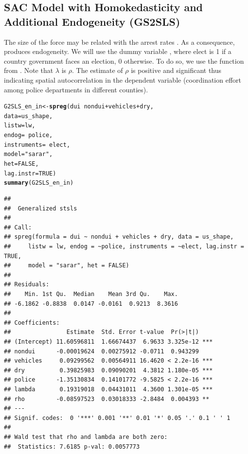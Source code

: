 \documentclass[english,12pt]{book}\usepackage[]{graphicx}\usepackage[]{xcolor}
\makeatletter
\newcommand{\hlnum}[1]{\textcolor[rgb]{0.686,0.059,0.569}{#1}}%
\newcommand{\hlstr}[1]{\textcolor[rgb]{0.192,0.494,0.8}{#1}}%
\newcommand{\hlopt}[1]{\textcolor[rgb]{0,0,0}{#1}}%
\newcommand{\hlstd}[1]{\textcolor[rgb]{0.345,0.345,0.345}{#1}}%
\newcommand{\hlkwb}[1]{\textcolor[rgb]{0.69,0.353,0.396}{#1}}%
\newcommand{\hlkwc}[1]{\textcolor[rgb]{0.333,0.667,0.333}{#1}}%
\newcommand{\hlkwd}[1]{\textcolor[rgb]{0.737,0.353,0.396}{\textbf{#1}}}%
\newenvironment{kframe}{%
 \def\at@end@of@kframe{}%
 \ifinner\ifhmode%
  \def\at@end@of@kframe{\end{minipage}}%
  \begin{minipage}{\columnwidth}%
 \fi\fi%
 \def\FrameCommand##1{\hskip\@totalleftmargin \hskip-\fboxsep
 \colorbox{shadecolor}{##1}\hskip-\fboxsep
     \hskip-\linewidth \hskip-\@totalleftmargin \hskip\columnwidth}%
 \MakeFramed {\advance\hsize-\width
   \@totalleftmargin\z@ \linewidth\hsize
   \@setminipage}}%
 {\par\unskip\endMakeFramed%
 \at@end@of@kframe}
\newenvironment{knitrout}{}{} %
\makeatother
\begin{document}
\subsection{SAC Model with Homokedasticity and Additional Endogeneity (GS2SLS)}

The size of the  force may be related with the arrest rates . As a consequence,  produces endogeneity. We will use the dummy variable , where elect is 1 if a country government faces an election, 0 otherwise. To do so, we use the  function from . Note that $\lambda$ is $\rho$. The estimate of $\rho$ is positive and significant thus indicating spatial autocorrelation in the dependent variable (coordination effort among police departments in different counties). 


\begin{knitrout}
\color{fgcolor}\begin{kframe}
\begin{alltt}
\hlstd{G2SLS_en_in} \hlkwb{<-} \hlkwd{spreg}\hlstd{(dui} \hlopt{~} \hlstd{nondui} \hlopt{+} \hlstd{vehicles} \hlopt{+} \hlstd{dry,}
                \hlkwc{data} \hlstd{= us_shape,}
                \hlkwc{listw} \hlstd{= lw,}
               \hlkwc{endog} \hlstd{=} \hlopt{~} \hlstd{police,}
               \hlkwc{instruments} \hlstd{=} \hlopt{~} \hlstd{elect,}
               \hlkwc{model} \hlstd{=} \hlstr{"sarar"}\hlstd{,}
               \hlkwc{het} \hlstd{=} \hlnum{FALSE}\hlstd{,}
               \hlkwc{lag.instr} \hlstd{=} \hlnum{TRUE}\hlstd{)}
\hlkwd{summary}\hlstd{(G2SLS_en_in)}
\end{alltt}
\begin{verbatim}
## 
##  Generalized stsls
## 
## Call:
## spreg(formula = dui ~ nondui + vehicles + dry, data = us_shape, 
##     listw = lw, endog = ~police, instruments = ~elect, lag.instr = TRUE, 
##     model = "sarar", het = FALSE)
## 
## Residuals:
##    Min. 1st Qu.  Median    Mean 3rd Qu.    Max. 
## -6.1862 -0.8838  0.0147 -0.0161  0.9213  8.3616 
## 
## Coefficients:
##                Estimate  Std. Error t-value  Pr(>|t|)    
## (Intercept) 11.60596811  1.66674437  6.9633 3.325e-12 ***
## nondui      -0.00019624  0.00275912 -0.0711  0.943299    
## vehicles     0.09299562  0.00564911 16.4620 < 2.2e-16 ***
## dry          0.39825983  0.09090201  4.3812 1.180e-05 ***
## police      -1.35130834  0.14101772 -9.5825 < 2.2e-16 ***
## lambda       0.19319018  0.04431011  4.3600 1.301e-05 ***
## rho         -0.08597523  0.03018333 -2.8484  0.004393 ** 
## ---
## Signif. codes:  0 '***' 0.001 '**' 0.01 '*' 0.05 '.' 0.1 ' ' 1
## 
## Wald test that rho and lambda are both zero:
##  Statistics: 7.6185 p-val: 0.0057773
\end{verbatim}
\end{kframe}
\end{knitrout}
\end{document}
